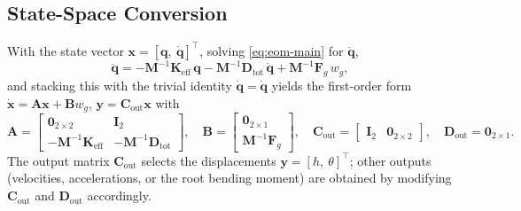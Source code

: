 \documentclass[
	a4paper, %
	10pt, %
]{CSUniSchoolLabReport}
\begin{document}
\subsection{State-Space Conversion}\label{sec:state-space}
With the state vector \(\mathbf x=[\mathbf q,\ \dot{\mathbf q}]^\top\), solving
\cref{eq:eom-main} for \(\ddot{\mathbf q}\),
\begin{equation}
    \ddot{\mathbf q}
    = -\mathbf M^{-1}\mathbf K_{\text{eff}}\,\mathbf q
    -\mathbf M^{-1}\mathbf D_{\text{tot}}\,\dot{\mathbf q}
    +\mathbf M^{-1}\mathbf F_g\,w_g ,
\end{equation}
and stacking this with the trivial identity \(\dot{\mathbf q}=\dot{\mathbf q}\) yields the
first-order form \(\dot{\mathbf x}=\mathbf A\mathbf x+\mathbf B w_g\),
\(\mathbf y=\mathbf C_{\text{out}}\mathbf x\) with
\begin{equation}
    \mathbf{A} =
    \begin{bmatrix}
        \mathbf{0}_{2\times2}                   & \mathbf{I}_2 \\[4pt]
        -\mathbf{M}^{-1}\mathbf{K}_{\text{eff}} &
        -\mathbf{M}^{-1}\mathbf{D}_{\text{tot}}
    \end{bmatrix},
    \quad
    \mathbf{B} =
    \begin{bmatrix} \mathbf{0}_{2\times1} \\[4pt]
        \mathbf{M}^{-1}\mathbf{F}_g\end{bmatrix},
    \quad
    \mathbf{C}_{\text{out}} =
    \begin{bmatrix} \mathbf{I}_2 & \mathbf{0}_{2\times2} \end{bmatrix},
    \quad
    \mathbf{D}_{\text{out}} = \mathbf{0}_{2\times1}.
\end{equation}
The output matrix \(\mathbf C_{\text{out}}\) selects the displacements
\(\mathbf y=[h,\ \theta]^\top\); other outputs (velocities, accelerations, or the root
bending moment) are obtained by modifying \(\mathbf C_{\text{out}}\) and
\(\mathbf D_{\text{out}}\) accordingly.
\end{document}
